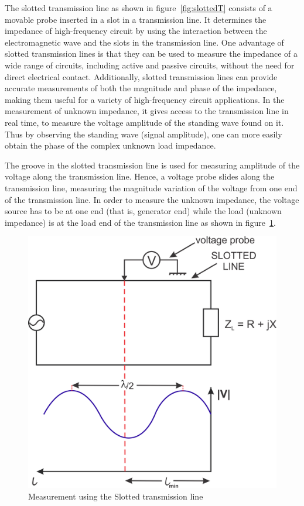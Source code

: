 The slotted transmission line as shown in figure~\ref{fig:slottedT} consists of a movable probe inserted in a slot in a transmission line. It determines the impedance of high-frequency circuit by using the interaction between the electromagnetic wave and the slots in the transmission line. One advantage of slotted transmission lines is that they can be used to measure the impedance of a wide range of circuits, including active and passive circuits, without the need for direct electrical contact. Additionally, slotted transmission lines can provide accurate measurements of both the magnitude and phase of the impedance, making them useful for a variety of high-frequency circuit applications. In the measurement of unknown impedance, it gives access to the transmission line in real time, to measure the voltage amplitude of the standing wave found on it. Thus by observing the standing wave (signal amplitude), one can more easily obtain the phase of the complex unknown load impedance.

The groove in the slotted transmission line is used for measuring amplitude of the voltage along the transmission line. Hence, a voltage probe slides along the transmission line, measuring the magnitude variation of the voltage from one end of the transmission line. In order to measure the unknown impedance, the voltage source has to be at one end (that is, generator end) while the load (unknown impedance) is at the load end of the transmission line as shown in figure~\ref{fig:group10diagram1}.
\begin{figure}[h]
\centering
\includegraphics[width=1\linewidth]{./graphics/group10diagram1}
\caption{Measurement using the Slotted transmission line}
\label{fig:group10diagram1}
\end{figure}

